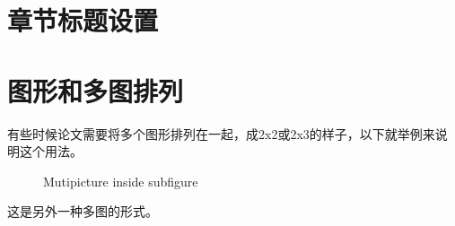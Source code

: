     \section{章节标题设置}
    \section{图形和多图排列}
    有些时候论文需要将多个图形排列在一起，成2x2或2x3的样子，以下就举例来说明这个用法。

\begin{figure}[htb]
    \hfill
    \caption{Mutipicture inside subfigure}
    \label{subfig1}
\end{figure}
这是另外一种多图的形式。\par

